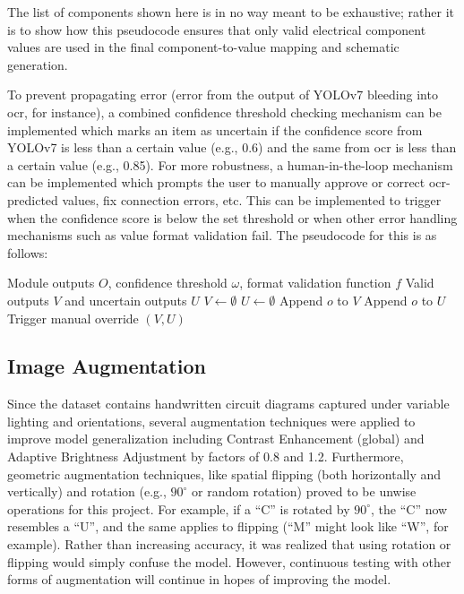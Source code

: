 The list of components shown here is in no way meant to be exhaustive; rather it is to show how this pseudocode ensures that only valid electrical component values are used in the final component-to-value mapping and schematic generation.

To prevent propagating error (error from the output of YOLOv7 bleeding into \gls{ocr}, for instance), a combined confidence threshold checking mechanism can be implemented which marks an item as uncertain if the confidence score from YOLOv7 is less than a certain value (e.g., 0.6) and the same from \gls{ocr} is less than a certain value (e.g., 0.85). For more robustness, a human-in-the-loop mechanism can be implemented which prompts the user to manually approve or correct \gls{ocr}-predicted values, fix connection errors, etc. This can be implemented to trigger when the confidence score is below the set threshold or when other error handling mechanisms such as value format validation fail. The pseudocode for this is as follows:

\begin{algorithm}
\caption{Confidence-Based Error Checking and Validation}
\label{algo:confidence-validation}
\begin{algorithmic}
\Require Module outputs $O$, confidence threshold $\omega$, format validation function $f$
\Ensure Valid outputs $V$ and uncertain outputs $U$
\State $V \leftarrow \emptyset$
\State $U \leftarrow \emptyset$
        \State Append $o$ to $V$
    \Else
        \State Append $o$ to $U$
    \EndIf
\EndFor
{}
    \State Trigger manual override
\EndIf
\State \Return $(V, U)$
\end{algorithmic}
\end{algorithm}

\subsection{Image Augmentation}

Since the dataset contains handwritten circuit diagrams captured under variable lighting and orientations, several augmentation techniques were applied to improve model generalization including Contrast Enhancement (global) and Adaptive Brightness Adjustment by factors of 0.8 and 1.2. Furthermore, geometric augmentation techniques, like spatial flipping (both horizontally and vertically) and rotation (e.g., $90^\circ$ or random rotation) proved to be unwise operations for this project. For example, if a ``C'' is rotated by $90^\circ$, the ``C'' now resembles a ``U'', and the same applies to flipping (``M'' might look like ``W'', for example). Rather than increasing accuracy, it was realized that using rotation or flipping would simply confuse the model. However, continuous testing with other forms of augmentation will continue in hopes of improving the model.

